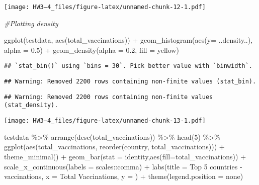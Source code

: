 \documentclass[
]{article}
\newenvironment{Shaded}{\begin{snugshade}}{\end{snugshade}}
\newcommand{\AttributeTok}[1]{\textcolor[rgb]{0.77,0.63,0.00}{#1}}
\newcommand{\CommentTok}[1]{\textcolor[rgb]{0.56,0.35,0.01}{\textit{#1}}}
\newcommand{\DecValTok}[1]{\textcolor[rgb]{0.00,0.00,0.81}{#1}}
\newcommand{\FloatTok}[1]{\textcolor[rgb]{0.00,0.00,0.81}{#1}}
\newcommand{\FunctionTok}[1]{\textcolor[rgb]{0.00,0.00,0.00}{#1}}
\newcommand{\NormalTok}[1]{#1}
\newcommand{\SpecialCharTok}[1]{\textcolor[rgb]{0.00,0.00,0.00}{#1}}
\newcommand{\StringTok}[1]{\textcolor[rgb]{0.31,0.60,0.02}{#1}}
\begin{document}
\texttt{[image: HW3---4\_files/figure-latex/unnamed-chunk-12-1.pdf]}

\begin{Shaded}
\begin{Highlighting}[]
\CommentTok{\#Plotting density }

\FunctionTok{ggplot}\NormalTok{(testdata, }\FunctionTok{aes}\NormalTok{(total\_vaccinations)) }\SpecialCharTok{+} \FunctionTok{geom\_histogram}\NormalTok{(}\FunctionTok{aes}\NormalTok{(}\AttributeTok{y=}\NormalTok{ ..density..), }\AttributeTok{alpha =} \FloatTok{0.5}\NormalTok{) }\SpecialCharTok{+} \FunctionTok{geom\_density}\NormalTok{(}\AttributeTok{alpha =} \FloatTok{0.2}\NormalTok{, }\AttributeTok{fill =} \StringTok{\textquotesingle{}yellow\textquotesingle{}}\NormalTok{)}
\end{Highlighting}
\end{Shaded}

\begin{verbatim}
## `stat_bin()` using `bins = 30`. Pick better value with `binwidth`.
\end{verbatim}

\begin{verbatim}
## Warning: Removed 2200 rows containing non-finite values (stat_bin).
\end{verbatim}

\begin{verbatim}
## Warning: Removed 2200 rows containing non-finite values (stat_density).
\end{verbatim}

\texttt{[image: HW3---4\_files/figure-latex/unnamed-chunk-13-1.pdf]}

\begin{Shaded}
\begin{Highlighting}[]
\NormalTok{testdata }\SpecialCharTok{\%\textgreater{}\%}
  \FunctionTok{arrange}\NormalTok{(}\FunctionTok{desc}\NormalTok{(total\_vaccinations)) }\SpecialCharTok{\%\textgreater{}\%}
  \FunctionTok{head}\NormalTok{(}\DecValTok{5}\NormalTok{) }\SpecialCharTok{\%\textgreater{}\%}
  \FunctionTok{ggplot}\NormalTok{(}\FunctionTok{aes}\NormalTok{(total\_vaccinations, }\FunctionTok{reorder}\NormalTok{(country, total\_vaccinations))) }\SpecialCharTok{+} \FunctionTok{theme\_minimal}\NormalTok{() }\SpecialCharTok{+} 
  \FunctionTok{geom\_bar}\NormalTok{(}\AttributeTok{stat =} \StringTok{\textquotesingle{}identity\textquotesingle{}}\NormalTok{,}\FunctionTok{aes}\NormalTok{(}\AttributeTok{fill=}\NormalTok{total\_vaccinations)) }\SpecialCharTok{+} \FunctionTok{scale\_x\_continuous}\NormalTok{(}\AttributeTok{labels =}\NormalTok{ scales}\SpecialCharTok{::}\NormalTok{comma) }\SpecialCharTok{+} 
  \FunctionTok{labs}\NormalTok{(}\AttributeTok{title =} \StringTok{\textquotesingle{}Top 5 countries {-} vaccinations\textquotesingle{}}\NormalTok{, }\AttributeTok{x =} \StringTok{\textquotesingle{}Total Vaccinations\textquotesingle{}}\NormalTok{, }\AttributeTok{y =} \StringTok{\textquotesingle{}\textquotesingle{}}\NormalTok{) }\SpecialCharTok{+} \FunctionTok{theme}\NormalTok{(}\AttributeTok{legend.position =} \StringTok{\textquotesingle{}none\textquotesingle{}}\NormalTok{)}
\end{Highlighting}
\end{Shaded}
\end{document}
